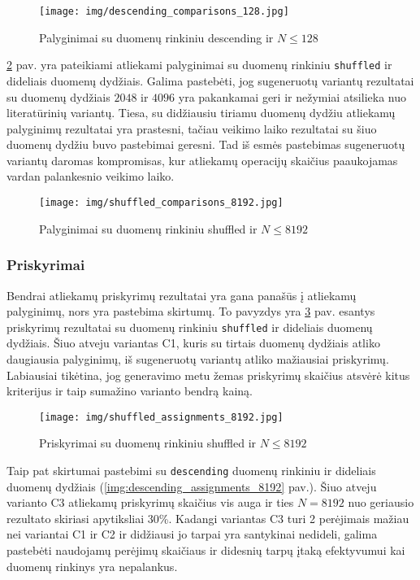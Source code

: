 \documentclass{VUMIFInfBakalaurinis}
\begin{document}
\begin{figure}[H]
  \centering
  \texttt{[image: img/descending\_comparisons\_128.jpg]}
  \caption{Palyginimai su duomenų rinkiniu descending ir $N \leq 128$}
  \label{img:descending_comparisons_128}
\end{figure}

\ref{img:shuffled_comparisons_8192} pav. yra pateikiami atliekami palyginimai su duomenų rinkiniu \verb|shuffled| ir dideliais duomenų dydžiais.
Galima pastebėti, jog sugeneruotų variantų rezultatai su duomenų dydžiais $2048$ ir $4096$ yra pakankamai geri ir nežymiai atsilieka nuo literatūrinių variantų.
Tiesa, su didžiausiu tiriamu duomenų dydžiu atliekamų palyginimų rezultatai yra prastesni, tačiau veikimo laiko rezultatai su šiuo duomenų dydžiu buvo pastebimai geresni.
Tad iš esmės pastebimas sugeneruotų variantų daromas kompromisas, kur atliekamų operacijų skaičius paaukojamas vardan palankesnio veikimo laiko.

\begin{figure}[H]
  \centering
  \texttt{[image: img/shuffled\_comparisons\_8192.jpg]}
  \caption{Palyginimai su duomenų rinkiniu shuffled ir $N \leq 8192$}
  \label{img:shuffled_comparisons_8192}
\end{figure}

\pagebreak

\subsubsection{Priskyrimai}

Bendrai atliekamų priskyrimų rezultatai yra gana panašūs į atliekamų palyginimų, nors yra pastebima skirtumų.
To pavyzdys yra \ref{img:shuffled_assignments_8192} pav. esantys priskyrimų rezultatai su duomenų rinkiniu \verb|shuffled| ir dideliais duomenų dydžiais.
Šiuo atveju variantas C1, kuris su tirtais duomenų dydžiais atliko daugiausia palyginimų, iš sugeneruotų variantų atliko mažiausiai priskyrimų.
Labiausiai tikėtina, jog generavimo metu žemas priskyrimų skaičius atsvėrė kitus kriterijus ir taip sumažino varianto bendrą kainą.    

\begin{figure}[H]
  \centering
  \texttt{[image: img/shuffled\_assignments\_8192.jpg]}
  \caption{Priskyrimai su duomenų rinkiniu shuffled ir $N \leq 8192$}
  \label{img:shuffled_assignments_8192}
\end{figure}

Taip pat skirtumai pastebimi su \verb|descending| duomenų rinkiniu ir dideliais duomenų dydžiais (\ref{img:descending_assignments_8192} pav.).
Šiuo atveju varianto C3 atliekamų priskyrimų skaičius vis auga ir ties $N = 8192$ nuo geriausio rezultato skiriasi apytiksliai 30\%.
Kadangi variantas C3 turi 2 perėjimais mažiau nei variantai C1 ir C2 ir didžiausi jo tarpai yra santykinai nedideli,
galima pastebėti naudojamų perėjimų skaičiaus ir didesnių tarpų įtaką efektyvumui kai duomenų rinkinys yra nepalankus.
\end{document}
